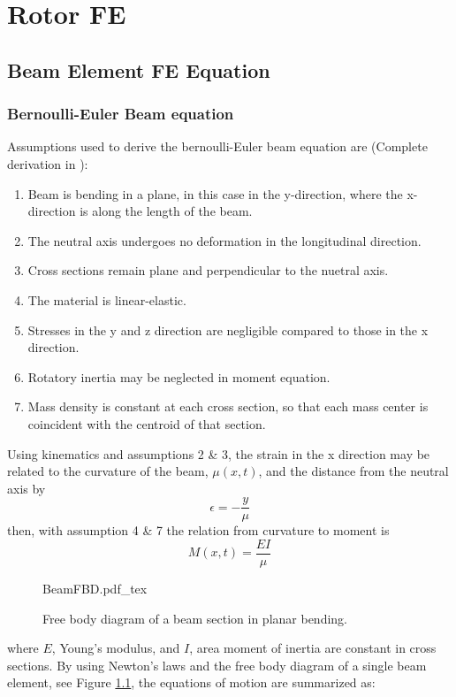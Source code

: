 \chapter{Rotor FE}
\section{Beam Element FE Equation}
\subsection{Bernoulli-Euler Beam equation}

Assumptions used to derive the bernoulli-Euler beam equation are (Complete derivation in \cite{craig2006fundamentals}):
\begin{enumerate}
	\item Beam is bending in a plane, in this case in the y-direction, where the x-direction is along the length of the beam.
	\item The  neutral axis undergoes no deformation in the longitudinal direction.
	\item Cross sections remain plane and perpendicular to the nuetral axis.
	\item The material is linear-elastic.
	\item Stresses in the y and z direction are negligible compared to those in the x direction.
	\item Rotatory inertia may be neglected in moment equation.
	\item Mass density is constant at each cross section, so that each mass center is coincident with the centroid of that section.
\end{enumerate}
Using kinematics and assumptions 2 \& 3, the strain in the x direction may be related to the curvature of the beam, $\mu(x,t)$, and the distance from the neutral axis by
\begin{equation} \label{eq:curvature}
\epsilon=-\dfrac{y}{\mu}
\end{equation}
then, with assumption 4 \& 7 the relation from curvature to moment is
\begin{equation} \label{eq:curv_moment}
M(x,t)=\dfrac{EI}{\mu}
\end{equation}
\begin{figure}
	\centering
	\def\svgwidth{300pt}
	{BeamFBD.pdf_tex}
	\caption{Free body diagram of a beam section in planar bending.}
	\label{fig:BeamFBD}
\end{figure}
where $ E $, Young's modulus, and $ I $, area moment of inertia are constant in cross sections. By using Newton's laws and the free body diagram of a single beam element, see Figure \ref{fig:BeamFBD}, the equations of motion are summarized as:
